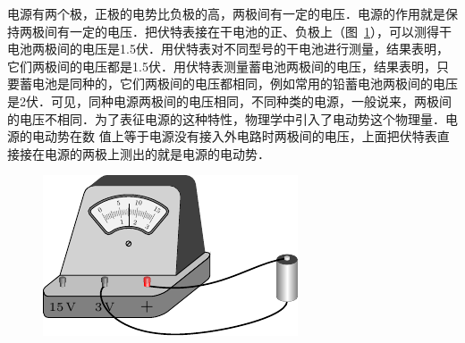 电源有两个极，正极的电势比负极的高，两极间有一定的电压．电源的作用就是保持两极间有一定的电压．把伏特表接在干电池的正、负极上（图~\ref{fig_B_7-24}），可以测得干电池两极间的电压是1.5伏．用伏特表对不同型号的干电池进行测量，结果表明，它们两极间的电压都是1.5伏．用伏特表测量蓄电池两极间的电压，结果表明，只要蓄电池是同种的，它们两极间的电压都相同，例如常用的铅蓄电池两极间的电压是2伏．可见，同种电源两极间的电压相同，不同种类的电源，一般说来，两极间的电压不相同．为了表征电源的这种特性，物理学中引入了电动势这个物理量．电源的电动势在数
值上等于电源没有接入外电路时两极间的电压，上面把伏特表直接接在电源的两极上测出的就是电源的电动势．

\begin{figure}[htbp]
	\centering
	\includegraphics{fig/B/7-24.pdf}
	\caption{}\label{fig_B_7-24}
\end{figure}


